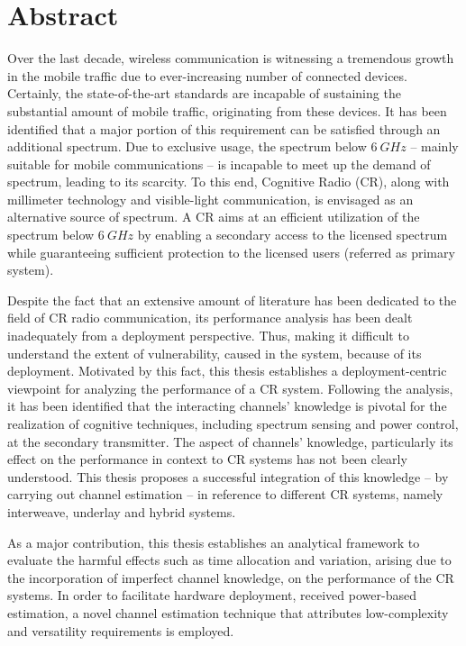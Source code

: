 
\chapter*{Abstract}
Over the last decade, wireless communication is witnessing a tremendous growth in the mobile traffic due to ever-increasing number of connected devices. Certainly, the state-of-the-art standards are incapable of sustaining the substantial amount of mobile traffic, originating from these devices. It has been identified that a major portion of this requirement can be satisfied through an additional spectrum. Due to exclusive usage, the spectrum below $\SI{6}{GHz}$ -- mainly suitable for mobile communications -- is incapable to meet up the demand of spectrum, leading to its scarcity. To this end, Cognitive Radio (CR), along with millimeter technology and visible-light communication, is envisaged as an alternative source of spectrum. A CR aims at an efficient utilization of the spectrum below $\SI{6}{GHz}$ by enabling a secondary access to the licensed spectrum while guaranteeing sufficient protection to the licensed users (referred as primary system). %


Despite the fact that an extensive amount of literature has been dedicated to the field of CR radio communication, its performance analysis has been dealt inadequately from a deployment perspective. Thus, making it difficult to understand the extent of vulnerability, caused in the system, because of its deployment. Motivated by this fact, this thesis establishes a deployment-centric viewpoint for analyzing the performance of a CR system. Following the analysis, it has been identified that the interacting channels' knowledge is pivotal for the realization of cognitive techniques, including spectrum sensing and power control, at the secondary transmitter. The aspect of channels' knowledge, particularly its effect on the performance in context to CR systems has not been clearly understood. This thesis proposes a successful integration of this knowledge -- by carrying out channel estimation -- in reference to different CR systems, namely interweave, underlay and hybrid systems. 

As a major contribution, this thesis establishes an analytical framework to evaluate the harmful effects such as time allocation and variation, arising due to the incorporation of imperfect channel knowledge, on the performance of the CR systems. In order to facilitate hardware deployment, received power-based estimation, a novel channel estimation technique that attributes low-complexity and versatility requirements is employed. 

